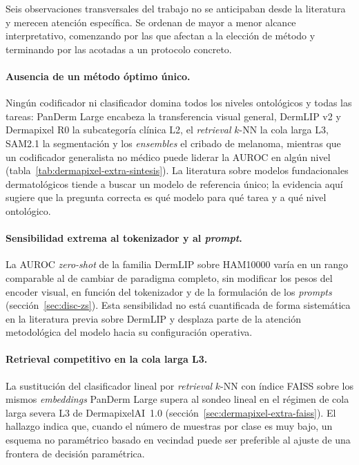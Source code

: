 Seis observaciones transversales del trabajo no se anticipaban desde la
literatura y merecen atención específica. Se ordenan de mayor a menor
alcance interpretativo, comenzando por las que afectan a la elección de
método y terminando por las acotadas a un protocolo concreto.

\paragraph{Ausencia de un método óptimo único.}
Ningún codificador ni clasificador domina todos los niveles ontológicos y
todas las tareas: PanDerm Large encabeza la transferencia visual general,
DermLIP v2 y Dermapixel R0 la subcategoría clínica L2, el \emph{retrieval}
$k$-NN la cola larga L3, SAM2.1 la segmentación y los \emph{ensembles} el
cribado de melanoma, mientras que un codificador generalista no médico
puede liderar la AUROC en algún nivel
(tabla~\ref{tab:dermapixel-extra-sintesis}). La literatura sobre modelos
fundacionales dermatológicos tiende a buscar un modelo de referencia
único; la evidencia aquí sugiere que la pregunta correcta es qué modelo
para qué tarea y a qué nivel ontológico.

\paragraph{Sensibilidad extrema al tokenizador y al \emph{prompt}.}
La AUROC \emph{zero-shot} de la familia DermLIP sobre HAM10000 varía en un
rango comparable al de cambiar de paradigma completo, sin modificar los
pesos del encoder visual, en función del tokenizador y de la formulación
de los \emph{prompts} (sección~\ref{sec:disc-zs}). Esta sensibilidad no
está cuantificada de forma sistemática en la literatura previa sobre
DermLIP y desplaza parte de la atención metodológica del modelo hacia su
configuración operativa.

\paragraph{Retrieval competitivo en la cola larga L3.}
La sustitución del clasificador lineal por \emph{retrieval} $k$-NN con
índice FAISS sobre los mismos \emph{embeddings} PanDerm Large supera al
sondeo lineal en el régimen de cola larga severa L3 de DermapixelAI~1.0
(sección~\ref{sec:dermapixel-extra-faiss}). El hallazgo indica que, cuando
el número de muestras por clase es muy bajo, un esquema no paramétrico
basado en vecindad puede ser preferible al ajuste de una frontera de
decisión paramétrica.

